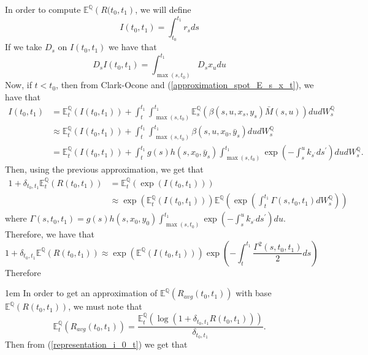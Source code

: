 \documentclass[a4paper,10pt]{article}
\newcommand{\1}{\mathbf{1}}
\begin{document}
In order to compute $\mathbb{E}^{\mathbb{Q}}\left(R(t_0,t_1\right)$, we will define
\begin{equation*}
I(t_0,t_1) = \int_{t_0}^{t_1} r_s ds
\end{equation*}
If we take $D_s$ on $I(t_0,t_1)$ we have that
\begin{equation*}
D_sI(t_0,t_1) = \int_{\max(s, t_{0})}^{t_1}  D_s x_u du 
\end{equation*}
Now, if $t < t_0$, then from Clark-Ocone and (\ref{approximation_spot_E_s_x_t}), we have that 
\begin{align}\label{apprx_I_t0_t1}
I(t_0,t_1) &= \mathbb{E}_t^{\mathbb{Q}}\left(I(t_0,t_1)\right) + \int_{t}^{t_1}\int_{\max(s, t_{0})}^{t_1}  \mathbb{E}_s^{\mathbb{Q}}\left(\beta(s,u,x_s,y_s) \bar{M}(s,u) \right) du dW_s^{\mathbb{Q}} \nonumber \\
&\approx \mathbb{E}_t^{\mathbb{Q}}\left(I(t_0,t_1)\right) + \int_{t}^{t_1}\int_{\max(s, t_{0})}^{t_1} \beta(s,u,x_0,\bar{y}_s) du dW_s^{\mathbb{Q}}\nonumber \\
&= \mathbb{E}_t^{\mathbb{Q}}\left(I(t_0,t_1)\right) + \int_{t}^{t_1} g(s)h(s,x_0,\bar{y}_s)\int_{\max(s, t_{0})}^{t_1} \exp\left( -\int_{s}^{u} k_{s^{\prime}} ds^{\prime}\right) du dW_s^{\mathbb{Q}}.
\end{align}
Then, using the previous approximation, we get that
\begin{align*}
1 + \delta_{t_0,t_1}\mathbb{E}_t^{\mathbb{Q}}\left(R(t_0,t_1)\right) &= \mathbb{E}_t^{\mathbb{Q}}\left( \exp(I(t_0,t_1)) \right)\\
&\approx \exp\left(\mathbb{E}_t^{\mathbb{Q}}\left(I(t_0,t_1)\right)\right)  \mathbb{E}^{\mathbb{Q}}\left(\exp\left(\int_{t}^{t_1} \Gamma(s,t_0,t_1)dW_s^{\mathbb{Q}}\right)\right)
\end{align*}
where $\Gamma(s,t_0,t_1)= g(s)h(s,x_0,y_0)\int_{\max(s, t_{0})}^{t_1} \exp\left( -\int_{s}^{u} k_{s^{\prime}} ds^{\prime}\right)du$. 
Therefore, we have that
\begin{equation}\label{representation_i_0_t}
1 + \delta_{t_0,t_1}\mathbb{E}^{\mathbb{Q}}\left(R(t_0,t_1)\right) \approx \exp\left(\mathbb{E}^{\mathbb{Q}}\left(I(t_0,t_1)\right)\right)\exp\left(-\int_{t}^{t_1}\frac{\Gamma^{2}(s,t_0,t_1)}{2} ds\right)
\end{equation}
Therefore

\hspace{2cm}
\fboxsep1em
In order to get an approximation of $\mathbb{E}^{\mathbb{Q}}\left(R_{avg}(t_0,t_1)\right)$ with base $\mathbb{E}^{\mathbb{Q}}\left(R(t_0,t_1)\right)$, we must note that 
\begin{equation*}
\mathbb{E}_t^{\mathbb{Q}}\left(R_{avg}(t_0,t_1)\right) = \frac{\mathbb{E}_t^{\mathbb{Q}}\left( \log(1+ \delta_{t_0,t_1} R(t_0,t_1))\right)}{ \delta_{t_0,t_1}}.
\end{equation*}
Then from (\ref{representation_i_0_t}) we get that
\end{document}
